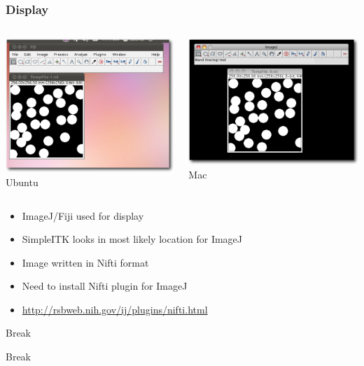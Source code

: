 \begin{frame}[fragile]
\frametitle{Display}
\begin{columns}[c]
\begin{center}
\includegraphics[width=1\textwidth]{Images/ImageDisplay_shadow} \\
Ubuntu
\end{center}
\begin{center}
\includegraphics[width=1\textwidth]{Images/ImageDisplayMac_shadow} \\
Mac
\end{center}
\end{columns}
\begin{itemize}
  \item ImageJ/Fiji used for display
  \item SimpleITK looks in most likely location for ImageJ
  \item Image written in Nifti format
  \item Need to install Nifti plugin for ImageJ
  \item \url{http://rsbweb.nih.gov/ij/plugins/nifti.html}
\end{itemize}
\end{frame}

\begin{frame}{Break}
\fontsize{36pt}{36pt}\selectfont
\center
\begin{center}
Break
\end{center}
\end{frame}


